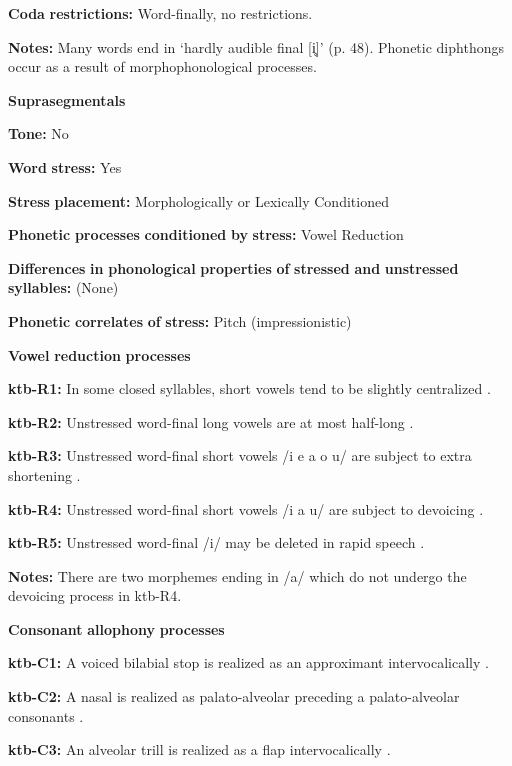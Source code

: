\textbf{Coda} \textbf{restrictions:} Word-finally, no restrictions.

\textbf{Notes:} Many words end in ‘hardly audible final [i̥]’ (p. 48). Phonetic diphthongs occur as a result of morphophonological processes.

\textbf{Suprasegmentals}

\textbf{Tone:} No

\textbf{Word} \textbf{stress:} Yes

\textbf{Stress} \textbf{placement:} Morphologically or Lexically Conditioned

\textbf{Phonetic} \textbf{processes} \textbf{conditioned} \textbf{by} \textbf{stress:} Vowel Reduction

\textbf{Differences} \textbf{in} \textbf{phonological} \textbf{properties} \textbf{of} \textbf{stressed} \textbf{and} \textbf{unstressed} \textbf{syllables:} (None)

\textbf{Phonetic} \textbf{correlates} \textbf{of} \textbf{stress:} Pitch (impressionistic)

\textbf{Vowel} \textbf{reduction} \textbf{processes}

\textbf{ktb-R1:} In some closed syllables, short vowels tend to be slightly centralized \citep[18]{Treis2008}.

\textbf{ktb-R2:} Unstressed word-final long vowels are at most half-long \citep[19]{Treis2008}.

\textbf{ktb-R3:} Unstressed word-final short vowels /i e a o u/ are subject to extra shortening \citep[20]{Treis2008}.

\textbf{ktb-R4:} Unstressed word-final short vowels /i a u/ are subject to devoicing \citep[20]{Treis2008}.

\textbf{ktb-R5:} Unstressed word-final /i/ may be deleted in rapid speech \citep[20]{Treis2008}.

\textbf{Notes:} There are two morphemes ending in /a/ which do not undergo the devoicing process in ktb-R4.

\textbf{Consonant} \textbf{allophony} \textbf{processes}

\textbf{ktb-C1:} A voiced bilabial stop is realized as an approximant intervocalically \citep[24]{Treis2008}.

\textbf{ktb-C2:} A nasal is realized as palato-alveolar preceding a palato-alveolar consonants \citep[34]{Treis2008}.

\textbf{ktb-C3:} An alveolar trill is realized as a flap intervocalically \citep[35]{Treis2008}.


